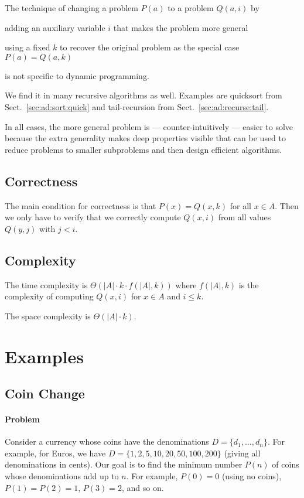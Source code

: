 \begin{remark}
The technique of changing a problem $P(a)$ to a problem $Q(a,i)$ by
\begin{compactitem}
 \item adding an auxiliary variable $i$ that makes the problem more general
 \item using a fixed $k$ to recover the original problem as the special case $P(a)=Q(a,k)$
\end{compactitem}
is not specific to dynamic programming.

We find it in many recursive algorithms as well.
Examples are quicksort from Sect.~\ref{sec:ad:sort:quick} and tail-recursion from Sect.~\ref{sec:ad:recurse:tail}.

In all cases, the more general problem is --- counter-intuitively --- easier to solve because the extra generality makes deep properties visible that can be used to reduce problems to smaller subproblems and then design efficient algorithms.
\end{remark}

\subsection{Correctness}
The main condition for correctness is that $P(x)=Q(x,k)$ for all $x\in A$.
Then we only have to verify that we correctly compute $Q(x,i)$ from all values $Q(y,j)$ with $j<i$.

\subsection{Complexity}
The time complexity is $\Theta(|A|\cdot k\cdot f(|A|,k))$ where $f(|A|,k)$ is the complexity of computing $Q(x,i)$ for $x\in A$ and $i\leq k$.

The space complexity is $\Theta(|A|\cdot k)$.

\section{Examples}

\subsection{Coin Change}

\paragraph{Problem}
Consider a currency whose coins have the denominations $D=\{d_1,\ldots,d_n\}$.
For example, for Euros, we have $D=\{1,2,5,10,20,50,100,200\}$ (giving all denominations in cents).
Our goal is to find the minimum number $P(n)$ of coins whose denominations add up to $n$.
For example, $P(0)=0$ (using no coins), $P(1)=P(2)=1$, $P(3)=2$, and so on.

